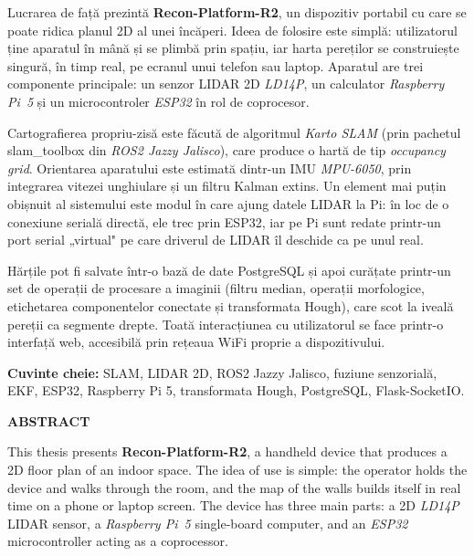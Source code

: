 \documentclass[a4paper,12pt,twoside,openany]{report}
\begin{document}
\noindent Lucrarea de față prezintă \textbf{Recon-Platform-R2}, un dispozitiv
portabil cu care se poate ridica planul 2D al unei încăperi. Ideea de
folosire este simplă: utilizatorul ține aparatul în mână și se plimbă prin
spațiu, iar harta pereților se construiește singură, în timp real, pe ecranul
unui telefon sau laptop. Aparatul are trei componente principale: un senzor
LIDAR 2D \textit{LD14P}, un calculator \textit{Raspberry Pi~5} și un
microcontroler \textit{ESP32} în rol de coprocesor.

Cartografierea propriu-zisă este făcută de algoritmul \textit{Karto SLAM}
(prin pachetul slam\_toolbox din \textit{ROS2 Jazzy Jalisco}), care produce o
hartă de tip \textit{occupancy grid}. Orientarea aparatului este estimată
dintr-un IMU \textit{MPU-6050}, prin integrarea vitezei unghiulare și un
filtru Kalman extins. Un element mai puțin obișnuit al sistemului este modul
în care ajung datele LIDAR la Pi: în loc de o conexiune serială directă, ele
trec prin ESP32, iar pe Pi sunt redate printr-un port serial „virtual" pe
care driverul de LIDAR îl deschide ca pe unul real.

Hărțile pot fi salvate într-o bază de date PostgreSQL și apoi curățate
printr-un set de operații de procesare a imaginii (filtru median, operații
morfologice, etichetarea componentelor conectate și transformata Hough),
care scot la iveală pereții ca segmente drepte. Toată interacțiunea cu
utilizatorul se face printr-o interfață web, accesibilă prin rețeaua WiFi
proprie a dispozitivului.

\medskip

\noindent\textbf{Cuvinte cheie:} SLAM, LIDAR 2D, ROS2 Jazzy Jalisco,
fuziune senzorială, EKF, ESP32, Raspberry Pi 5, transformata Hough,
PostgreSQL, Flask-SocketIO.

\clearpage

\thispagestyle{coperta}
\vspace*{12pt}
\begin{center}{\fontsize{20pt}{24pt}\bfseries ABSTRACT}\end{center}
\vspace{24pt}

\noindent This thesis presents \textbf{Recon-Platform-R2}, a handheld device
that produces a 2D floor plan of an indoor space. The idea of use is simple:
the operator holds the device and walks through the room, and the map of the
walls builds itself in real time on a phone or laptop screen. The device has
three main parts: a 2D \textit{LD14P} LIDAR sensor, a \textit{Raspberry Pi~5}
single-board computer, and an \textit{ESP32} microcontroller acting as a
coprocessor.
\end{document}
